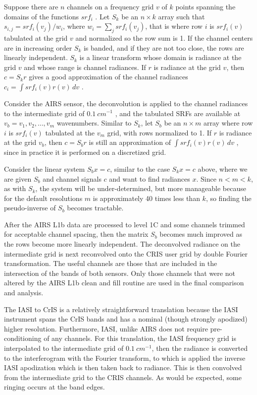 \documentclass[twocolumn,10pt]{article}
\begin{document}
Suppose there are \(n\) channels on a frequency grid \(v\) of \(k\) points spanning the domains of the functions \(srf_i\) . Let \(S_k\) be an \(n\times k\) array such that \(s_{i,j} = srf_i(v_j)/w_i\), where \(w_i = \sum_j srf_i(v_j)\), that is where row \(i\) is \(srf_i(v)\) tabulated at the grid \(v\) and normalized so the row sum is 1.  If the channel centers are in increasing order \(S_k\) is banded, and if they are not too close,  the rows are linearly independent.  \(S_k\) is a linear transform whose domain is radiance at the grid \(v\) and whose range is channel radiances.  If \(r\) is radiance at the grid \(v\), then \(c = S_k r\) gives a good approximation of the channel radiances \(c_i = \int srf_i(v)r(v)\,dv\) .

Consider the AIRS sensor, the deconvolution is applied to the channel radiances to the intermediate grid of \(0.1\ cm^{-1}\) , and the tabulated SRFs are available at \(v_b = v_1,v_2,\ldots,v_m\) wavenumbers.  Similar to \(S_k\), let \(S_b\) be an \(n\times m\) array where row \(i\) is \(srf_i(v)\) tabulated at the \(v_m\) grid, with rows normalized to 1. If \(r\) is radiance at the grid \(v_b\), then \(c = S_b r\) is still an approximation of \(\int srf_i(v)r(v)\,dv\) , since in practice it is performed on a discretized grid.

Consider the linear system \(S_b x = c\), similar to the case \(S_k x = c\) above, where we are given \(S_b\) and channel signals \(c\) and want to find radiances \(x\).  Since \(n < m < k\), as with \(S_k\), the system will be under-determined, but more manageable because for the default resolutions \(m\) is approximately 40 times less than \(k\), so finding the pseudo-inverse of \(S_b\) becomes tractable.

After the AIRS L1b data are processed to level 1C and some channels trimmed for acceptable channel spacing, then the matrix \(S_b\) becomes much improved as the rows become more linearly independent. The deconvolved radiance on the intermediate grid is next reconvolved onto the CRIS user grid by double Fourier transformation. The useful channels are those that are included in the intersection of the bands of both sensors.  Only those channels that were not altered by the AIRS L1b clean and fill routine are used in the final comparison and analysis.

The IASI to CrIS is a relatively straightforward translation because the IASI instrument spans the CrIS bands and has a nominal (though strongly apodized) higher resolution. Furthermore, IASI, unlike AIRS does not require pre-conditioning of any channels. For this translation, the IASI frequency grid is interpolated to the intermediate grid of \(0.1\ cm^{-1}\), then the radiance is converted to the interferogram with the Fourier transform, to which is applied the inverse IASI apodization which is then taken back to radiance. This is then convolved from the intermediate grid to the CRIS channels. As would be expected, some ringing occurs at the band edges.
\end{document}
